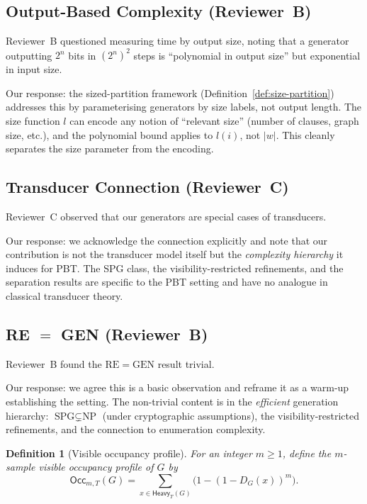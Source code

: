 \documentclass[11pt]{article}
\newcommand{\SPG}{\text{SPG}}
\newcommand{\NP}{\text{NP}}
\newtheorem{definition}{Definition}[section]
\theoremstyle{remark}
\theoremstyle{definition}
\begin{document}
\subsection{Output-Based Complexity (Reviewer~B)}

Reviewer~B questioned measuring time by output size, noting that a generator
outputting $2^n$ bits in $(2^n)^2$ steps is ``polynomial in output size'' but
exponential in input size.

Our response: the sized-partition framework (Definition~\ref{def:size-partition})
addresses this by parameterising generators by size labels, not output
length.  The size function $l$ can encode any notion of ``relevant size''
(number of clauses, graph size, etc.), and the polynomial bound applies to
$l(i)$, not $|w|$.  This cleanly separates the size parameter from the
encoding.

\subsection{Transducer Connection (Reviewer~C)}

Reviewer~C observed that our generators are special cases of transducers.

Our response: we acknowledge the connection explicitly and note that our
contribution is not the transducer model itself but the \emph{complexity
hierarchy} it induces for PBT.  The SPG class, the visibility-restricted
refinements, and the separation results are specific to the PBT setting
and have no analogue in classical transducer theory.

\subsection{RE $=$ GEN (Reviewer~B)}

Reviewer~B found the $\mathrm{RE} = \mathrm{GEN}$ result trivial.

Our response: we agree this is a basic observation and reframe it as a
warm-up establishing the setting.  The non-trivial content is in the
\emph{efficient} generation hierarchy: $\SPG{} \subsetneq \NP{}$ (under
cryptographic assumptions), the visibility-restricted refinements, and the
connection to enumeration complexity.

\begin{definition}[Visible occupancy profile]
For an integer $m \ge 1$, define the $m$-sample visible occupancy profile of $G$ by
\[
\mathsf{Occ}_{m,T}(G) = \sum_{x \in \mathsf{Heavy}_T(G)} \bigl(1 - (1 - D_G(x))^m\bigr).
\]
\end{definition}
\end{document}
